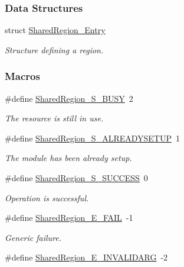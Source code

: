 \subsubsection*{Data Structures}
\begin{DoxyCompactItemize}
\item 
struct \hyperlink{struct_shared_region___entry}{Shared\-Region\-\_\-\-Entry}
\begin{DoxyCompactList}\small\item\em Structure defining a region. \end{DoxyCompactList}\end{DoxyCompactItemize}
\subsubsection*{Macros}
\begin{DoxyCompactItemize}
\item 
\#define \hyperlink{_shared_region_8h_a6600547ee6e6f87175f7031004206e9e}{Shared\-Region\-\_\-\-S\-\_\-\-B\-U\-S\-Y}~2
\begin{DoxyCompactList}\small\item\em The resource is still in use. \end{DoxyCompactList}\item 
\#define \hyperlink{_shared_region_8h_a016c010c7acdf21d0138f54002eb1783}{Shared\-Region\-\_\-\-S\-\_\-\-A\-L\-R\-E\-A\-D\-Y\-S\-E\-T\-U\-P}~1
\begin{DoxyCompactList}\small\item\em The module has been already setup. \end{DoxyCompactList}\item 
\#define \hyperlink{_shared_region_8h_aeb2b620491aa7fb3f25603b651e037a5}{Shared\-Region\-\_\-\-S\-\_\-\-S\-U\-C\-C\-E\-S\-S}~0
\begin{DoxyCompactList}\small\item\em Operation is successful. \end{DoxyCompactList}\item 
\#define \hyperlink{_shared_region_8h_a38d229410cc0928a0ece957d8b525c5e}{Shared\-Region\-\_\-\-E\-\_\-\-F\-A\-I\-L}~-\/1
\begin{DoxyCompactList}\small\item\em Generic failure. \end{DoxyCompactList}\item 
\#define \hyperlink{_shared_region_8h_ae6cbeb3d372c004105fa71df5710cb25}{Shared\-Region\-\_\-\-E\-\_\-\-I\-N\-V\-A\-L\-I\-D\-A\-R\-G}~-\/2

\end{DoxyCompactItemize}
